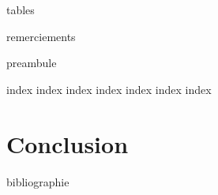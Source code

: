 


\frontmatter


{tables}

\printglossary

{remerciements}

{preambule}

\mainmatter

{index}
{index}
{index}
{index}
{index}
{index}
{index}

\chapter{Conclusion}


\backmatter

{bibliographie}


\newcommand\listfigurenameappendixes{\listfigurename}
\newcommand\listtablenameappendixes{\listtablename}

\begin{appendices}
    
\end{appendices}

